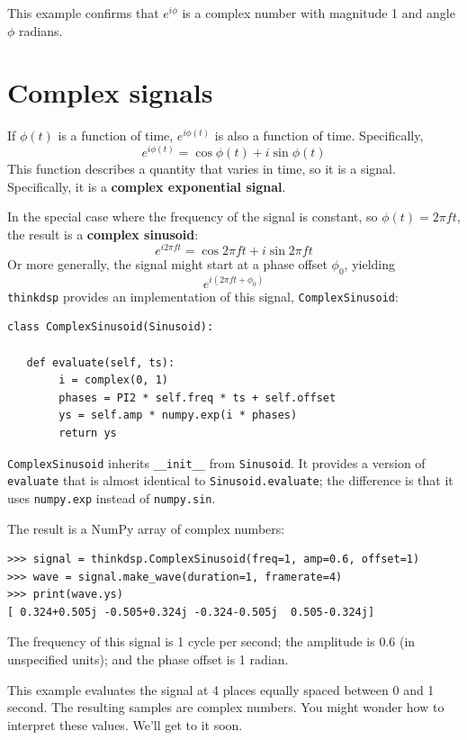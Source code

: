 \documentclass[12pt]{book}
\begin{document}
This example confirms that $e^{i \phi}$ is a complex number with
magnitude 1 and angle $\phi$ radians.


\section{Complex signals}

If $\phi(t)$ is a function of time, $e^{i \phi(t)}$ is also a function
of time.  Specifically,
%
\[ e^{i \phi(t)} = \cos \phi(t) + i \sin \phi(t) \]
%
This function describes a quantity that varies in time, so it is
a signal.  Specifically, it is a {\bf complex exponential signal}.

In the special case where the frequency of the signal is constant,
so $\phi(t) = 2 \pi f t$, the result is a {\bf complex sinusoid}:
%
\[ e^{i 2 \pi f t} = \cos 2 \pi f t + i \sin 2 \pi f t \]
%
Or more generally, the signal might start at a phase offset
$\phi_0$, yielding
%
\[ e^{i (2 \pi f t + \phi_0)} \]
%
{\tt thinkdsp} provides an implementation of this signal,
{\tt ComplexSinusoid}:

\begin{verbatim}
class ComplexSinusoid(Sinusoid):
 
   def evaluate(self, ts):
        i = complex(0, 1)
        phases = PI2 * self.freq * ts + self.offset
        ys = self.amp * numpy.exp(i * phases)
        return ys
\end{verbatim}

{\tt ComplexSinusoid} inherits \verb"__init__" from
{\tt Sinusoid}.  It provides a version of {\tt evaluate}
that is almost identical to {\tt Sinusoid.evaluate}; the
difference is that it uses {\tt numpy.exp} instead of
{\tt numpy.sin}.

The result is a NumPy array of complex numbers:

\begin{verbatim}
>>> signal = thinkdsp.ComplexSinusoid(freq=1, amp=0.6, offset=1)
>>> wave = signal.make_wave(duration=1, framerate=4)
>>> print(wave.ys)
[ 0.324+0.505j -0.505+0.324j -0.324-0.505j  0.505-0.324j]
\end{verbatim}

The frequency of this signal is 1 cycle per second; the amplitude
is 0.6 (in unspecified units); and the phase offset is 1 radian.

This example evaluates the signal at 4 places equally spaced between
0 and 1 second.  The resulting samples are complex numbers.  You
might wonder how to interpret these values.  We'll get to it soon.
\end{document}

